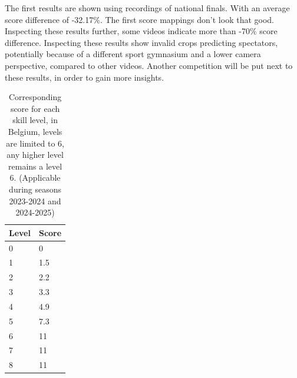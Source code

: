 The first results are shown using recordings of national finals. With an average score difference of -32.17\%. The first score mappings don't look that good.
Inspecting these results further, some videos indicate more than -70\% score difference. Inspecting these results show invalid crops predicting spectators, potentially because of a different sport gymnasium and a lower camera perspective, compared to other videos.
Another competition will be put next to these results, in order to gain more insights.

\begin{table}
    \begin{tabular}{|l|l|}
        \hline Level & Score \\ \hline
        0 & 0 \\
        1 & 1.5 \\
        2 & 2.2 \\
        3 & 3.3 \\
        4 & 4.9 \\
        5 & 7.3 \\
        6 & 11 \\
        7 & 11 \\
        8 & 11 \\ \hline
    \end{tabular}
    \caption[level to score map]{Corresponding score for each skill level, in Belgium, levels are limited to 6, any higher level remains a level 6. (Applicable during seasons 2023-2024 and 2024-2025)}
    \label{tbl:Score mapping}
\end{table}

